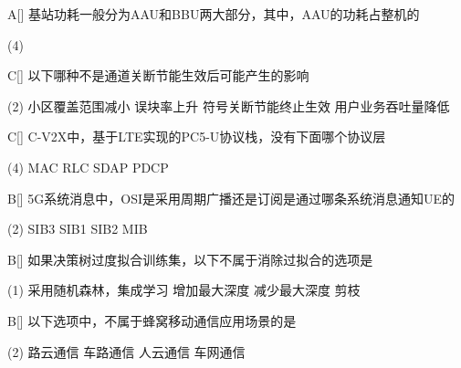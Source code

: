 \begin{choice}{A}[]
    基站功耗一般分为AAU和BBU两大部分，其中，AAU的功耗占整机的
    \begin{tasks}(4)
    \end{tasks}
\end{choice}




\begin{choice}{C}[]
    以下哪种不是通道关断节能生效后可能产生的影响
    \begin{tasks}(2)
        \task 小区覆盖范围减小
        \task 误块率上升
        \task 符号关断节能终止生效
        \task 用户业务吞吐量降低
    \end{tasks}
\end{choice}

\begin{choice}{C}[]
    C-V2X中，基于LTE实现的PC5-U协议栈，没有下面哪个协议层
    \begin{tasks}(4)
        \task MAC
        \task RLC
        \task SDAP
        \task PDCP
    \end{tasks}
\end{choice}

\begin{choice}{B}[]
    5G系统消息中，OSI是采用周期广播还是订阅是通过哪条系统消息通知UE的
    \begin{tasks}(2)
        \task SIB3
        \task SIB1
        \task SIB2
        \task MIB
    \end{tasks}
\end{choice}


\begin{choice}{B}[]
    如果决策树过度拟合训练集，以下不属于消除过拟合的选项是
    \begin{tasks}(1)
        \task 采用随机森林，集成学习
        \task 增加最大深度
        \task 减少最大深度
        \task 剪枝
    \end{tasks}
\end{choice}


\begin{choice}{B}[]
    以下选项中，不属于蜂窝移动通信应用场景的是
    \begin{tasks}(2)
        \task 路云通信
        \task 车路通信
        \task 人云通信
        \task 车网通信
    \end{tasks}
\end{choice}



